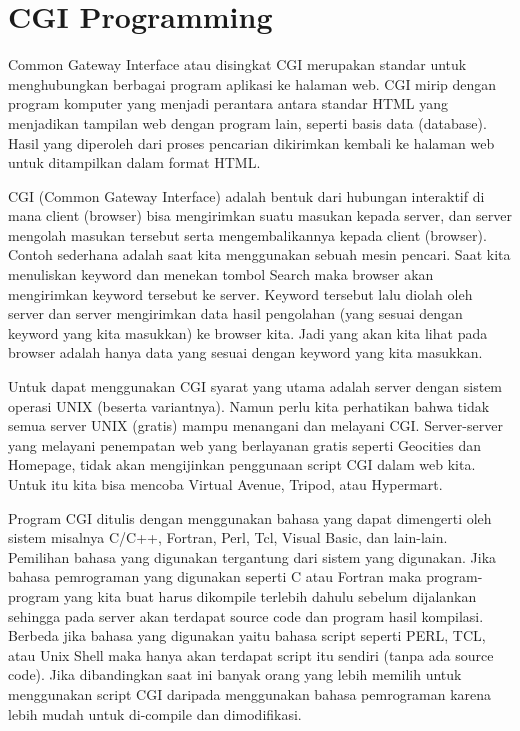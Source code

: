 \documentclass{wileySix}
\begin{document}
\chapter{CGI Programming}
\par
\vspace{14pt}
Common Gateway Interface atau disingkat CGI merupakan standar untuk menghubungkan berbagai program aplikasi ke halaman web. CGI mirip dengan program komputer yang menjadi perantara antara standar HTML yang menjadikan tampilan web dengan program lain, seperti basis data (database). Hasil yang diperoleh dari proses pencarian dikirimkan kembali ke halaman web untuk ditampilkan dalam format HTML.  \par
\vspace{12pt}
CGI (Common Gateway Interface) adalah bentuk dari hubungan interaktif di mana client (browser) bisa mengirimkan suatu masukan kepada server, dan server mengolah masukan tersebut serta mengembalikannya kepada client (browser). Contoh sederhana adalah saat kita menggunakan sebuah mesin pencari. Saat kita menuliskan keyword dan menekan tombol Search maka browser akan mengirimkan keyword tersebut ke server. Keyword tersebut lalu diolah oleh server dan server mengirimkan data hasil pengolahan (yang sesuai dengan keyword yang kita masukkan) ke browser kita. Jadi yang akan kita lihat pada browser adalah  hanya data yang sesuai dengan keyword yang kita masukkan. \par
\vspace{12pt}
Untuk dapat menggunakan CGI syarat yang utama adalah server dengan sistem operasi UNIX (beserta variantnya). Namun perlu kita perhatikan bahwa tidak semua server UNIX (gratis) mampu menangani dan melayani CGI. Server-server yang melayani penempatan web yang berlayanan gratis seperti Geocities dan Homepage, tidak akan mengijinkan penggunaan script CGI dalam web kita. Untuk itu kita bisa mencoba Virtual Avenue, Tripod, atau Hypermart. \par
\vspace{12pt}
Program CGI ditulis dengan menggunakan bahasa yang dapat dimengerti oleh sistem misalnya C/C++, Fortran, Perl, Tcl, Visual Basic, dan lain-lain. Pemilihan bahasa yang digunakan tergantung dari sistem yang digunakan. Jika bahasa pemrograman yang digunakan seperti C atau Fortran maka program-program yang kita buat harus dikompile terlebih dahulu sebelum dijalankan sehingga pada server akan terdapat source code dan program hasil kompilasi. Berbeda jika bahasa yang digunakan yaitu bahasa script seperti PERL, TCL, atau Unix Shell maka hanya akan terdapat script itu sendiri (tanpa ada source code). Jika dibandingkan saat ini banyak orang yang lebih memilih untuk menggunakan script CGI daripada menggunakan bahasa pemrograman karena lebih mudah untuk di-compile dan dimodifikasi.  \par
\end{document}
